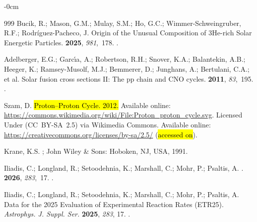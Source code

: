 \documentclass[particles,article,accept,pdftex,moreauthors]{Definitions/mdpi}
\begin{document}
\begin{adjustwidth}{-\extralength}{0cm}
\begin{thebibliography}{999}
Bucik, R.; Mason, G.M.;  Mulay, S.M.; Ho, G.C.; Wimmer-Schweingruber, R.F.; Rodríguez-Pacheco, J.
\newblock Origin of the Unusual Composition of 3He-rich Solar Energetic
  Particles.
 {\bf 2025}, {\em 981},~178.
.

Adelberger, E.G.; Garc{\'\i}a, A.;  Robertson, R.H.; Snover, K.A.; Balantekin, A.B.; Heeger, K.; Ramsey-Musolf, M.J.; Bemmerer, D.; Junghans, A.; Bertulani, C.A.; et al.
\newblock Solar fusion cross sections II: The pp chain and CNO cycles.
 {\bf 2011}, {\em 83},~195.
.

Szam, D.
\newblock \hl{Proton--Proton Cycle. 2012.} %
\newblock
Available online:   \url{https://commons.wikimedia.org/wiki/File:Proton_proton_cycle.svg}.
\newblock Licensed Under  (CC~BY-SA~2.5) via  Wikimedia Commons.
Available online:   \url{https://creativecommons.org/licenses/by-sa/2.5/} (\hl{accessed on}).

Krane, K.S.
; John Wiley \& Sons:  Hoboken, NJ, USA,  1991.

Iliadis, C.; Longland, R.;  Setoodehnia, K.; Marshall, C.; Mohr, P.; Psaltis, A.
.
 {\bf 2026}, {\em 283},~17.
.



Iliadis, C.; Longland, R.;  Setoodehnia, K.; Marshall, C.; Mohr, P.; Psaltis, A.
\newblock Data for the 2025 Evaluation of Experimental Reaction Rates (ETR25). \emph{ Astrophys. J. Suppl. Ser.}
 \textbf{2025}, \emph{283}, 17.
.


\end{thebibliography}
\end{adjustwidth}
\end{document}
